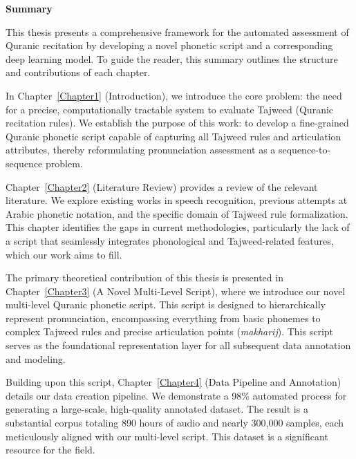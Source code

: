 \cleardoublepage
\newpage
\thispagestyle{empty}
{}



\begin{center}\huge \textbf{Summary}\end{center}


%


This thesis presents a comprehensive framework for the automated assessment of Quranic recitation by developing a novel phonetic script and a corresponding deep learning model. To guide the reader, this summary outlines the structure and contributions of each chapter.

In Chapter~\ref{Chapter1} (Introduction), we introduce the core problem: the need for a precise, computationally tractable system to evaluate Tajweed (Quranic recitation rules). We establish the purpose of this work: to develop a fine-grained Quranic phonetic script capable of capturing all Tajweed rules and articulation attributes, thereby reformulating pronunciation assessment as a sequence-to-sequence problem.

Chapter~\ref{Chapter2} (Literature Review) provides a review of the relevant literature. We explore existing works in speech recognition, previous attempts at Arabic phonetic notation, and the specific domain of Tajweed rule formalization. This chapter identifies the gaps in current methodologies, particularly the lack of a script that seamlessly integrates phonological and Tajweed-related features, which our work aims to fill.

The primary theoretical contribution of this thesis is presented in Chapter~\ref{Chapter3} (A Novel Multi-Level Script), where we introduce our novel multi-level Quranic phonetic script. This script is designed to hierarchically represent pronunciation, encompassing everything from basic phonemes to complex Tajweed rules and precise articulation points (\textit{makharij}). This script serves as the foundational representation layer for all subsequent data annotation and modeling.

Building upon this script, Chapter~\ref{Chapter4} (Data Pipeline and Annotation) details our data creation pipeline. We demonstrate a 98\% automated process for generating a large-scale, high-quality annotated dataset. The result is a substantial corpus totaling 890 hours of audio and nearly 300,000 samples, each meticulously aligned with our multi-level script. This dataset is a significant resource for the field.

